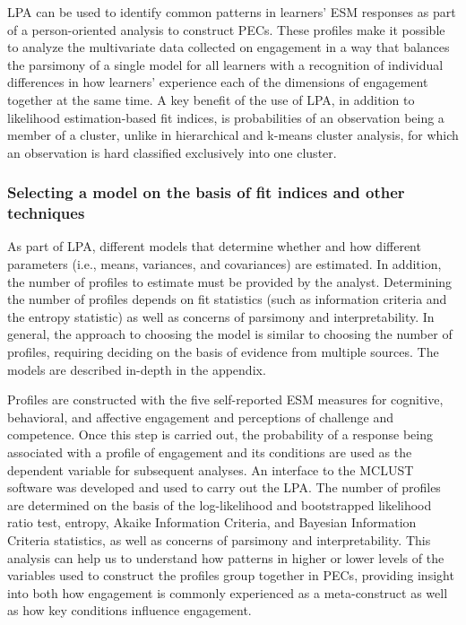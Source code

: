 \documentclass[]{book}
\theoremstyle{definition}
\theoremstyle{definition}
\theoremstyle{definition}
\theoremstyle{remark}
\begin{document}
LPA can be used to identify common patterns in learners' ESM responses
as part of a person-oriented analysis to construct PECs. These profiles
make it possible to analyze the multivariate data collected on
engagement in a way that balances the parsimony of a single model for
all learners with a recognition of individual differences in how
learners' experience each of the dimensions of engagement together at
the same time. A key benefit of the use of LPA, in addition to
likelihood estimation-based fit indices, is probabilities of an
observation being a member of a cluster, unlike in hierarchical and
k-means cluster analysis, for which an observation is hard classified
exclusively into one cluster.

\subsubsection{Selecting a model on the basis of fit indices and other
techniques}\label{selecting-a-model-on-the-basis-of-fit-indices-and-other-techniques}

As part of LPA, different models that determine whether and how
different parameters (i.e., means, variances, and covariances) are
estimated. In addition, the number of profiles to estimate must be
provided by the analyst. Determining the number of profiles depends on
fit statistics (such as information criteria and the entropy statistic)
as well as concerns of parsimony and interpretability. In general, the
approach to choosing the model is similar to choosing the number of
profiles, requiring deciding on the basis of evidence from multiple
sources. The models are described in-depth in the appendix.

Profiles are constructed with the five self-reported ESM measures for
cognitive, behavioral, and affective engagement and perceptions of
challenge and competence. Once this step is carried out, the probability
of a response being associated with a profile of engagement and its
conditions are used as the dependent variable for subsequent analyses.
An interface to the MCLUST software was developed and used to carry out
the LPA. The number of profiles are determined on the basis of the
log-likelihood and bootstrapped likelihood ratio test, entropy, Akaike
Information Criteria, and Bayesian Information Criteria statistics, as
well as concerns of parsimony and interpretability. This analysis can
help us to understand how patterns in higher or lower levels of the
variables used to construct the profiles group together in PECs,
providing insight into both how engagement is commonly experienced as a
meta-construct as well as how key conditions influence engagement.
\end{document}
